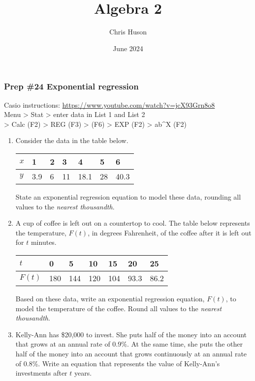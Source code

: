 \documentclass[12pt, twoside]{article}
\title{Algebra 2}
\author{Chris Huson}
\date{June 2024}
\begin{document}
\subsubsection*{Prep \#24 Exponential regression}
Casio instructions: \url{https://www.youtube.com/watch?v=jcX93Grn8o8} \\[0.25cm]
Menu \textgreater{} Stat \textgreater{} enter data in List 1 and List 2 \\ \textgreater{} Calc (F2) \textgreater{} REG (F3) \textgreater{} (F6) \textgreater{} EXP (F2) \textgreater{} ab\textasciicircum{}X (F2)
\begin{enumerate}[itemsep=0.5cm]
\item Consider the data in the table below.
    \begin{center}
    \begin{tabular}{|p{1cm}|p{1cm}|p{1cm}|p{1cm}|p{1cm}|p{1cm}|p{1cm}|}
        \hline
        $x$ & 1 & 2 & 3 & 4 & 5 & 6 \\
        \hline
        $y$ & 3.9 & 6 & 11 & 18.1 & 28 & 40.3 \\[0.25cm]
        \hline
    \end{tabular}
    \end{center}
    State an exponential regression equation to model these data, rounding all values to the \emph{nearest thousandth}.  \vspace{2cm} %

\item A cup of coffee is left out on a countertop to cool. The table below represents the temperature, $F(t)$, in degrees Fahrenheit, of the coffee after it is left out for $t$ minutes.
    \begin{center}
    \begin{tabular}{|p{1cm}|p{1cm}|p{1cm}|p{1cm}|p{1cm}|p{1cm}|p{1cm}|}
        \hline
        $t$ & 0 & 5 & 10 & 15 & 20 & 25 \\
        \hline
        $F(t)$ & 180 & 144 & 120 & 104 & 93.3 & 86.2 \\[0.25cm]
        \hline
    \end{tabular}
    \end{center}
    Based on these data, write an exponential regression equation, $F(t)$, to model the temperature of the coffee. Round all values to the \emph{nearest thousandth}.  \vspace{2cm} %

\item Kelly-Ann has \$20,000 to invest. She puts half of the money into an account that grows at an annual rate of 0.9\%. %
At the same time, she puts the other half of the money into an account that grows continuously at an annual rate of 0.8\%. Write an equation that represents the value of Kelly-Ann's investments after $t$ years.
    

\end{enumerate}
\end{document}

